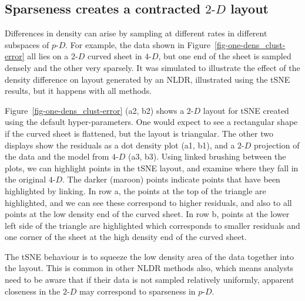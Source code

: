 \documentclass[
  12pt]{article}
\newcommand\pD{$p\text{-}D$}
\newcommand\gD{$2\text{-}D$}
\newcommand\fD{$4\text{-}D$}
\begin{document}
\subsection{\texorpdfstring{Sparseness creates a contracted \gD{}
layout}{Sparseness creates a contracted  layout}}\label{sec-effect-dens}

Differences in density can arise by sampling at different rates in
different subspaces of \pD{}. For example, the data shown in
Figure~\ref{fig-one-dens_clust-error} all lies on a \gD{} curved sheet
in \fD{}, but one end of the sheet is sampled densely and the other very
sparsely. It was simulated to illustrate the effect of the density
difference on layout generated by an NLDR, illustrated using the tSNE
results, but it happens with all methods.

Figure~\ref{fig-one-dens_clust-error} (a2, b2) shows a \gD{} layout for
tSNE created using the default hyper-parameters. One would expect to see
a rectangular shape if the curved sheet is flattened, but the layout is
triangular. The other two displays show the residuals as a dot density
plot (a1, b1), and a \gD{} projection of the data and the model from
\fD{} (a3, b3). Using linked brushing between the plots, we can
highlight points in the tSNE layout, and examine where they fall in the
original \fD{}. The darker (maroon) points indicate points that have
been highlighted by linking. In row a, the points at the top of the
triangle are highlighted, and we can see these correspond to higher
residuals, and also to all points at the low density end of the curved
sheet. In row b, points at the lower left side of the triangle are
highlighted which corresponds to smaller residuals and one corner of the
sheet at the high density end of the curved sheet.

The tSNE behaviour is to squeeze the low density area of the data
together into the layout. This is common in other NLDR methods also,
which means analysts need to be aware that if their data is not sampled
relatively uniformly, apparent closeness in the \gD{} may correspond to
sparseness in \pD{}.
\end{document}
